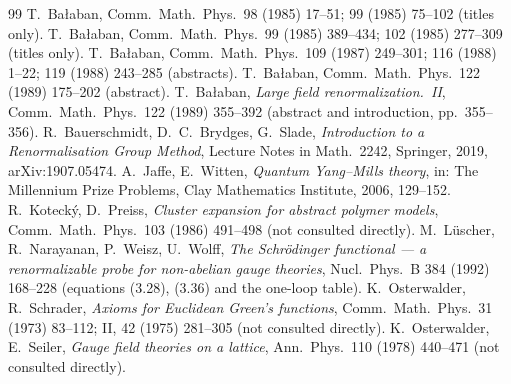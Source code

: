 \documentclass[11pt,a4paper]{article}
\theoremstyle{definition}
\theoremstyle{remark}
\begin{document}
\begin{thebibliography}{99}
 T.~Bałaban, Comm.\ Math.\ Phys.\ 98 (1985) 17--51; 99 (1985) 75--102 (titles only).
 T.~Bałaban, Comm.\ Math.\ Phys.\ 99 (1985) 389--434; 102 (1985) 277--309 (titles only).
 T.~Bałaban, Comm.\ Math.\ Phys.\ 109 (1987) 249--301; 116 (1988) 1--22; 119 (1988) 243--285 (abstracts).
 T.~Bałaban, Comm.\ Math.\ Phys.\ 122 (1989) 175--202 (abstract).
 T.~Bałaban, \emph{Large field renormalization.~II}, Comm.\ Math.\ Phys.\ 122 (1989) 355--392 (abstract and introduction, pp.~355--356).
 R.~Bauerschmidt, D.~C.~Brydges, G.~Slade, \emph{Introduction to a Renormalisation Group Method}, Lecture Notes in Math.\ 2242, Springer, 2019, arXiv:1907.05474.
 A.~Jaffe, E.~Witten, \emph{Quantum Yang--Mills theory}, in: The Millennium Prize Problems, Clay Mathematics Institute, 2006, 129--152.
 R.~Kotecký, D.~Preiss, \emph{Cluster expansion for abstract polymer models}, Comm.\ Math.\ Phys.\ 103 (1986) 491--498 (not consulted directly).
 M.~Lüscher, R.~Narayanan, P.~Weisz, U.~Wolff, \emph{The Schrödinger functional --- a renormalizable probe for non-abelian gauge theories}, Nucl.\ Phys.\ B 384 (1992) 168--228 (equations (3.28), (3.36) and the one-loop table).
 K.~Osterwalder, R.~Schrader, \emph{Axioms for Euclidean Green's functions}, Comm.\ Math.\ Phys.\ 31 (1973) 83--112; II, 42 (1975) 281--305 (not consulted directly).
 K.~Osterwalder, E.~Seiler, \emph{Gauge field theories on a lattice}, Ann.\ Phys.\ 110 (1978) 440--471 (not consulted directly).
\end{thebibliography}
\end{document}
